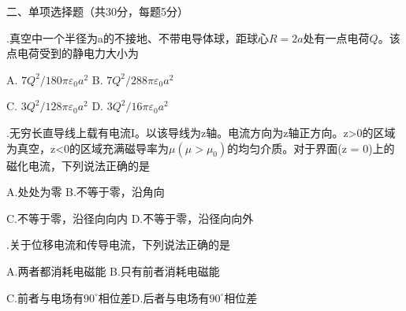 \noindent
二、\hspace{0.2em}单项选择题（共30分，每题5分）
\vspace{0.2cm}

.\hspace{0.8em}真空中一个半径为a的不接地、不带电导体球，距球心$R = 2a$处有一点电荷$Q$。该点电荷受到的静电力大小为
\vspace{0.2cm}

A.\hspace{0.8em} $7Q^2 / 180 \pi \varepsilon_0 a^2$ \hspace{10em} B.\hspace{0.8em} $7Q^2 / 288 \pi \varepsilon_0 a^2$\vspace{0.2cm}

C.\hspace{0.8em} $3 Q^2 / 128 \pi \varepsilon_0 a^2$ \hspace{10em} D.\hspace{0.8em} $ 3Q^2 / 16 \pi \varepsilon_0 a^2$
\vspace{0.2cm}

.\hspace{0.8em}无穷长直导线上载有电流I。以该导线为z轴。电流方向为z轴正方向。z>0的区域为真空，z<0的区域充满磁导率为$\mu (\mu > \mu_0 )$的均匀介质。对于界面(z = 0)上的磁化电流，下列说法正确的是
\vspace{0.2cm}

A.\hspace{0.8em}处处为零 \hspace{11em}B.\hspace{0.8em}不等于零，沿角向

C.\hspace{0.8em}不等于零，沿径向向内 \hspace{5em}D.\hspace{0.8em}不等于零，沿径向向外
\vspace{0.2cm}

.\hspace{0.8em}关于位移电流和传导电流，下列说法正确的是\vspace{0.2cm}

A.\hspace{0.8em}两者都消耗电磁能 \hspace{8em}B.\hspace{0.8em}只有前者消耗电磁能

C.\hspace{0.8em}前者与电场有$90^{\circ}$相位差\hspace{5.3em}D.\hspace{0.8em}后者与电场有$90^{\circ}$相位差

